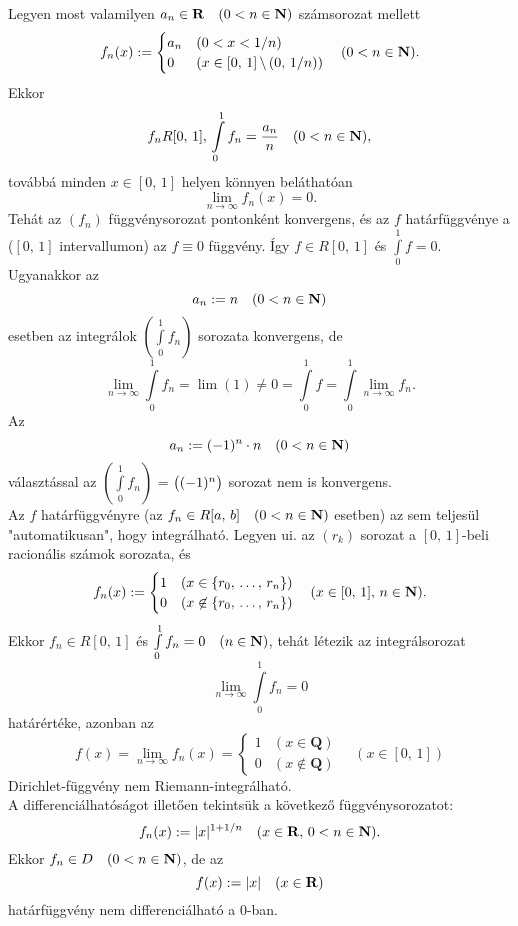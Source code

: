 Legyen most valamilyen $a_n \in \mathbf{R} \quad (0 < n \in \mathbf{N})$ számsorozat mellett
\[
	f_n(x) := \begin{cases}
		a_n & (0 < x < 1/n) \\
		0 & (x \in [0, \, 1] \, \backslash \, (0, \, 1/n))
	\end{cases} \quad (0 < n \in \mathbf{N}).
\]
Ekkor
\[
	f_n R[0, \, 1], \, \int\limits_0^1 f_n = \frac{a_n}{n} \quad (0 < n \in \mathbf{N}),
\]
továbbá minden $x \in [0, \, 1]$ helyen könnyen beláthatóan
\[
	\lim_{n \to \infty} f_n(x) = 0.
\]
Tehát az $(f_n)$ függvénysorozat pontonként konvergens, és az $f$ határfüggvénye a ($[0, \, 1]$ intervallumon) az $f \equiv 0$ függvény. Így $f \in R[0, \, 1]$ és $\int\limits_0^1 f = 0$. Ugyanakkor az
\[
	a_n := n \quad (0 < n \in \mathbf{N})
\]
esetben az integrálok $(\int\limits_0^1 f_n)$ sorozata konvergens, de
\[
	\lim_{n \to \infty} \int\limits_0^1 f_n = \lim(1) \neq 0 = \int\limits_0^1 f = \int\limits_0^1 \lim_{n\to \infty} f_n.
\]
Az
\[
	a_n := (-1)^n \cdot n \quad (0 < n \in \mathbf{N})
\]
választással az $(\int\limits_0^1 f_n)$  = $\big(  (-1)^n  \big)$ sorozat nem is konvergens.\\

Az $f$ határfüggvényre (az $f_n \in R[a, \, b] \quad (0 < n \in \mathbf{N} )$ esetben) az sem teljesül "automatikusan", hogy integrálható. Legyen ui. az $(r_k)$ sorozat a $[0, \, 1]$-beli racionális számok sorozata, és
\[
	f_n(x) := \begin{cases}
		1 & (x \in \{ r_0, \, \dots, \, r_n \}) \\
		0 & (x \not \in \{ r_0, \, \dots, \, r_n \})
	\end{cases} \quad (x \in [0, \, 1], \, n \in \mathbf{N}).
\] 
Ekkor $f_n \in R[0, \, 1]$ és $\int\limits_0^1 f_n = 0 \quad (n \in \mathbf{N})$, tehát létezik az integrálsorozat
\[
	\lim_{n\to \infty} \int\limits_0^1 f_n = 0
\]
határértéke, azonban az
\[
	f(x) = \lim_{n \to \infty} f_n(x) = \begin{cases}
		1 & (x \in \mathbf{Q}) \\
		0 & (x \not \in \mathbf{Q})
	\end{cases} \quad (x \in [0, \, 1])
\]
Dirichlet-függvény nem Riemann-integrálható.\\

A differenciálhatóságot illetően tekintsük a következő függvénysorozatot:
\[
	f_n(x) := |x|^{1 + 1/n} \quad (x \in \mathbf{R}, \, 0 < n \in \mathbf{N}).
\]
Ekkor $f_n \in D \quad (0 < n \in \mathbf{N})$, de az
\[
	f(x) := |x| \quad (x \in \mathbf{R})
\]
határfüggvény nem differenciálható a $0$-ban.\\

